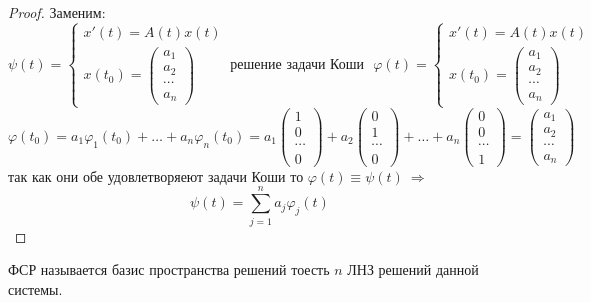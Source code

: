 \begin{proof}
  Заменим:
  $$
  \psi(t) =
  \left\{
  \begin{array}{l}
  x'(t) = A(t)x(t)\\
  x(t_0) =
  \left(
  \begin{array}{c}
    a_1 \\
    a_2 \\
    \cdots \\
    a_n
  \end{array}
  \right)
  \end{array}
  \right. ~ \text{решение задачи Коши} ~~~
  \varphi(t) =
  \left\{
  \begin{array}{c}
  x'(t) = A(t)x(t)\\
  x(t_0) =
  \left(
  \begin{array}{c}
    a_1 \\
    a_2 \\
    \cdots \\
    a_n
  \end{array}
  \right)
  \end{array}
  \right.
  $$
  $$
  \varphi(t_0) = a_1 \varphi_1(t_0) + \ldots + a_n \varphi_n(t_0) =
  a_1
  \left(
  \begin{array}{c}
    1 \\
    0 \\
    \cdots \\
    0
  \end{array}
  \right) +
  a_2
  \left(
  \begin{array}{c}
    0 \\
    1 \\
    \cdots \\
    0
  \end{array}
  \right) + \ldots +
  a_n
  \left(
  \begin{array}{c}
    0 \\
    0 \\
    \cdots \\
    1
  \end{array}
  \right) =
  \left(
  \begin{array}{c}
    a_1 \\
    a_2 \\
    \cdots \\
    a_n
  \end{array}
  \right)
  $$
  так как они обе удовлетворяеют задачи Коши то $\varphi(t) \equiv \psi(t) ~
  \Rightarrow$
  $$
  \psi(t) = \sum_{j=1}^n a_j \varphi_j(t)
  $$
\end{proof}

\begin{define}[ФСР]
  ФСР называется базис пространства решений тоесть $n$ ЛНЗ решений данной
  системы.
\end{define}

